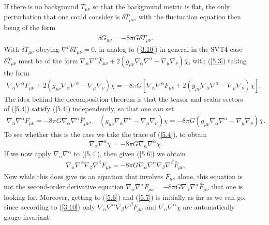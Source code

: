 \documentclass[aps,onecolumn,10pt]{revtex4}
\numberwithin{equation}{section}
\numberwithin{equation}{section}
\begin{document}
If there is no background $T_{\mu\nu}$ so that the background metric is flat, the only perturbation that one could consider is $\delta \bar{T}_{\mu\nu}$, with the fluctuation equation then being of the form 
%
\begin{eqnarray}
\delta G_{\mu\nu}=-8 \pi G \delta \bar{T}_{\mu\nu}. 
\label{5.3}
\end{eqnarray}
%
With  $\delta \bar{T}_{\mu\nu}$ obeying $\nabla^{\nu}\delta \bar{T}_{\mu\nu}=0$, in analog to (\ref{3.10}) in general in the SVT4 case $\delta \bar{T}_{\mu\nu}$ must be of the form $\nabla_{\alpha}\nabla^{\alpha}\bar{F}_{\mu\nu}+2(g_{\mu\nu}\nabla_{\alpha}\nabla^{\alpha}-\nabla_{\mu}\nabla_{\nu})\bar{\chi}$, with (\ref{5.3}) taking the form 
%
\begin{eqnarray}
\nabla_{\alpha}\nabla^{\alpha}F_{\mu\nu}+2(g_{\mu\nu}\nabla_{\alpha}\nabla^{\alpha}-\nabla_{\mu}\nabla_{\nu})\chi=-8 \pi G[\nabla_{\alpha}\nabla^{\alpha}\bar{F}_{\mu\nu}+2(g_{\mu\nu}\nabla_{\alpha}\nabla^{\alpha}-\nabla_{\mu}\nabla_{\nu})\bar{\chi}]. 
\label{5.4}
\end{eqnarray}
%
The idea behind the decomposition theorem is that the tensor and scalar sectors of (\ref{5.4}) satisfy (\ref{5.4}) independently, so that one can set 
%
\begin{eqnarray}
\nabla_{\alpha}\nabla^{\alpha}F_{\mu\nu}=-8 \pi G\nabla_{\alpha}\nabla^{\alpha}\bar{F}_{\mu\nu},\quad
(g_{\mu\nu}\nabla_{\alpha}\nabla^{\alpha}-\nabla_{\mu}\nabla_{\nu})\chi=-8 \pi G(g_{\mu\nu}\nabla_{\alpha}\nabla^{\alpha}-\nabla_{\mu}\nabla_{\nu})\bar{\chi}. 
\label{5.5}
\end{eqnarray}
%
To see whether this is the case we take the trace of (\ref{5.4}), to obtain 
%
\begin{eqnarray}
\nabla_{\alpha}\nabla^{\alpha}\chi=-8 \pi G\nabla_{\alpha}\nabla^{\alpha}\bar{\chi}. 
\label{5.6}
\end{eqnarray}
%
If we now apply $\nabla_{\alpha}\nabla^{\alpha}$ to (\ref{5.4}), then given (\ref{5.6})  we obtain
%
\begin{eqnarray}
\nabla_{\alpha}\nabla^{\alpha}\nabla_{\beta}\nabla^{\beta}F_{\mu\nu}=-8\pi G \nabla_{\alpha}\nabla^{\alpha}\nabla_{\beta}\nabla^{\beta}\bar{F}_{\mu\nu}.
\label{5.7}
\end{eqnarray}
% 
Now while this does give us an equation that involves $F_{\mu\nu}$ alone, this equation is not the second-order derivative equation $\nabla_{\alpha}\nabla^{\alpha}F_{\mu\nu}=-8 \pi G\nabla_{\alpha}\nabla^{\alpha}\bar{F}_{\mu\nu}$ that one is looking for. Moreover, getting to (\ref{5.6}) and (\ref{5.7}) is initially as far as we can go, since according to  (\ref{3.10}) only $\nabla_{\alpha}\nabla^{\alpha}\nabla_{\beta}\nabla^{\beta}F_{\mu\nu}$ and $\nabla_{\alpha}\nabla^{\alpha}\chi$ are automatically gauge invariant.
\end{document}
